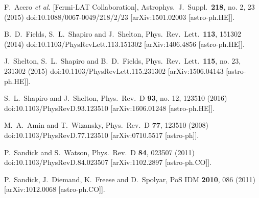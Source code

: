 \documentclass[11pt]{article}
\begin{document}
\begin{thebibliography}{99}
  F.~Acero {\it et al.} [Fermi-LAT Collaboration],
  Astrophys.\ J.\ Suppl.\  {\bf 218}, no. 2, 23 (2015)
  doi:10.1088/0067-0049/218/2/23
  [arXiv:1501.02003 [astro-ph.HE]].
  
  
  B.~D.~Fields, S.~L.~Shapiro and J.~Shelton,
  Phys.\ Rev.\ Lett.\  {\bf 113}, 151302 (2014)
  doi:10.1103/PhysRevLett.113.151302
  [arXiv:1406.4856 [astro-ph.HE]].
  
  
  J.~Shelton, S.~L.~Shapiro and B.~D.~Fields,
  Phys.\ Rev.\ Lett.\  {\bf 115}, no. 23, 231302 (2015)
  doi:10.1103/PhysRevLett.115.231302
  [arXiv:1506.04143 [astro-ph.HE]].
  
  
  S.~L.~Shapiro and J.~Shelton,
  Phys.\ Rev.\ D {\bf 93}, no. 12, 123510 (2016)
  doi:10.1103/PhysRevD.93.123510
  [arXiv:1606.01248 [astro-ph.HE]].


  M.~A.~Amin and T.~Wizansky,
  Phys.\ Rev.\ D {\bf 77}, 123510 (2008)
  doi:10.1103/PhysRevD.77.123510
  [arXiv:0710.5517 [astro-ph]].
  
  
  P.~Sandick and S.~Watson,
  Phys.\ Rev.\ D {\bf 84}, 023507 (2011)
  doi:10.1103/PhysRevD.84.023507
  [arXiv:1102.2897 [astro-ph.CO]].
  
  
  P.~Sandick, J.~Diemand, K.~Freese and D.~Spolyar,
  PoS IDM {\bf 2010}, 086 (2011)
  [arXiv:1012.0068 [astro-ph.CO]].
  

\end{thebibliography}
\end{document}
